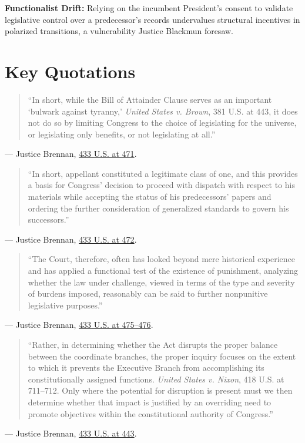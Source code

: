 \documentclass[12pt]{article}
\begin{document}
\textbf{Functionalist Drift:} Relying on the incumbent President's consent to validate legislative control over a predecessor's records undervalues structural incentives in polarized transitions, a vulnerability Justice Blackmun foresaw.

\section{Key Quotations}
\begin{quote}
``In short, while the Bill of Attainder Clause serves as an important `bulwark against tyranny,' \textit{United States v. Brown}, 381 U.S. at 443, it does not do so by limiting Congress to the choice of legislating for the universe, or legislating only benefits, or not legislating at all.''
\end{quote}
\noindent --- Justice Brennan, \href{https://supreme.justia.com/cases/federal/us/433/425/}{433 U.S. at 471}.

\begin{quote}
``In short, appellant constituted a legitimate class of one, and this provides a basis for Congress' decision to proceed with dispatch with respect to his materials while accepting the status of his predecessors' papers and ordering the further consideration of generalized standards to govern his successors.''
\end{quote}
\noindent --- Justice Brennan, \href{https://supreme.justia.com/cases/federal/us/433/425/}{433 U.S. at 472}.

\begin{quote}
``The Court, therefore, often has looked beyond mere historical experience and has applied a functional test of the existence of punishment, analyzing whether the law under challenge, viewed in terms of the type and severity of burdens imposed, reasonably can be said to further nonpunitive legislative purposes.''
\end{quote}
\noindent --- Justice Brennan, \href{https://supreme.justia.com/cases/federal/us/433/425/}{433 U.S. at 475--476}.

\begin{quote}
``Rather, in determining whether the Act disrupts the proper balance between the coordinate branches, the proper inquiry focuses on the extent to which it prevents the Executive Branch from accomplishing its constitutionally assigned functions. \textit{United States v. Nixon}, 418 U.S. at 711--712. Only where the potential for disruption is present must we then determine whether that impact is justified by an overriding need to promote objectives within the constitutional authority of Congress.''
\end{quote}
\noindent --- Justice Brennan, \href{https://supreme.justia.com/cases/federal/us/433/425/}{433 U.S. at 443}.
\end{document}
